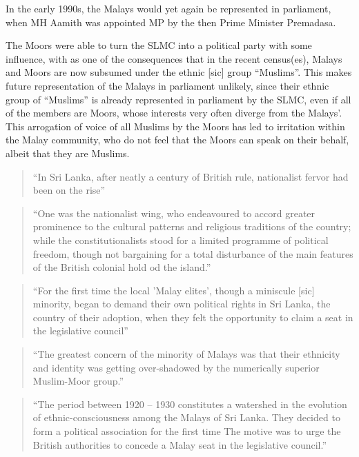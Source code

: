 In the early 1990s, the Malays would yet again be represented in parliament, when MH Aamith was appointed MP by the then Prime Minister \kuckn Premadasa.


 The Moors were able to turn the SLMC into a political party with some influence, with as one of the consequences that in the recent census(es)\kuckn, Malays and Moors are now subsumed under the ethnic [sic] group ``Muslims''. This makes future representation of the Malays in parliament unlikely, since their ethnic group of ``Muslims'' is already represented in parliament by the SLMC, even if all of the members are Moors, whose interests very often diverge from the Malays'. This arrogation \kuckn of voice of all Muslims by the Moors has led to irritation within the Malay community, who do not feel that the Moors can speak on their behalf, albeit that they are Muslims.






\begin{quote}
    ``In Sri Lanka, after neatly a century of British rule, nationalist fervor had been on the rise''\citet[15]{Hussainmiya1987}
\end{quote}

\begin{quote}
    ``One was the nationalist wing, who endeavoured to accord greater prominence to the cultural patterns and religious traditions of the country; while the constitutionalists stood for a limited programme of political freedom, though not bargaining for a total disturbance of the main features of the British colonial hold od the island.''\citet[15]{Hussainmiya1987}
\end{quote}

\begin{quote}
    ``For the first time the local 'Malay elites', though a miniscule [sic] minority, began to demand their own political rights in Sri Lanka, the country of their adoption, when they felt the opportunity to claim a seat in the legislative council''\citet[15f]{Hussainmiya1987}
\end{quote}

\begin{quote}
    ``The greatest concern of the minority of Malays was that their ethnicity and identity was getting over-shadowed by the numerically superior Muslim-Moor group.''\citet[16]{Hussainmiya1987}
\end{quote}

\begin{quote}
    ``The period between 1920 -- 1930 constitutes a watershed in the evolution of ethnic-consciousness among the Malays of Sri Lanka. They decided to form a political association for the first time \el The motive was to urge the British authorities to concede a Malay seat in the legislative council.''\citet[16]{Hussainmiya1987}
\end{quote}

